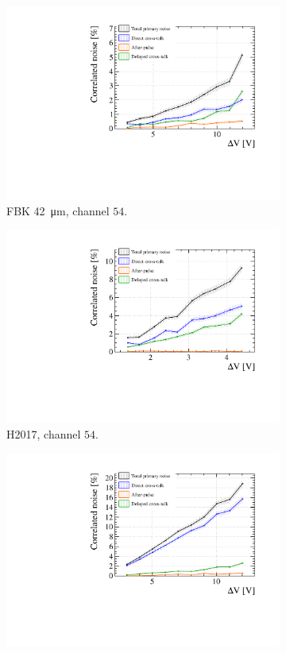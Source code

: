 \begin{figure}[htbp]
\begin{subfigure}{0.48\textwidth}
    \includegraphics[width=1\linewidth]{gfx/plots/WA/42/CorrelatedNoise.pdf}
    \caption{FBK \SI{42}{\micro m}, channel $54$.}
    \label{fig:}
  \end{subfigure}
  \hfill
   \begin{subfigure}{0.48\textwidth}
    \includegraphics[width=1\linewidth]{gfx/plots/WA/H2017/CorrelatedNoise.pdf}
    \caption{H2017, channel $54$.}
  \end{subfigure}
  \hfill
   \begin{subfigure}{0.48\textwidth}
    \includegraphics[width=1\linewidth]{gfx/plots/WA/31epoxy/CorrelatedNoise.pdf}

\end{subfigure}
\end{figure}
